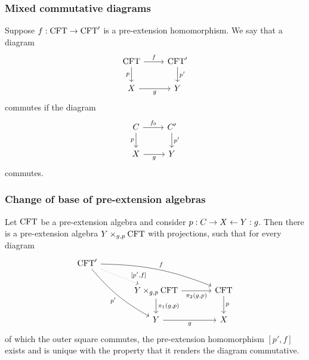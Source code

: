\documentclass{beamer}
\newcommand\important[1]{\textbf{\color{red!90!black}#1}}
\begin{document}
\begin{frame}
\frametitle{\bf Mixed commutative diagrams}
Suppose $f:\mathrm{CFT}\to\mathrm{CFT}'$ is a pre-extension homomorphism. We say that
a diagram
\begin{equation*}
\begin{tikzcd}[ampersand replacement=\&]
\stesys
  \ar{r}{f}
  \ar{d}[swap]{p}
  \&
\stesys'
  \ar{d}{p'}
  \\
X \ar{r}[swap]{g}
  \&
Y
\end{tikzcd}
\end{equation*}
commutes if the diagram
\begin{equation*}
\begin{tikzcd}[ampersand replacement=\&]
\stesysc
  \ar{r}{f_0}
  \ar{d}[swap]{p}
  \&
\stesysc'
  \ar{d}{p'}
  \\
X \ar{r}[swap]{g}
  \&
Y
\end{tikzcd}
\end{equation*}
commutes.
\end{frame}

\begin{frame}
\frametitle{\bf Change of base of pre-extension algebras}
Let $\mathrm{CFT}$ be a pre-extension algebra and consider $p:C\rightarrow X\leftarrow Y:g$.
Then there is a pre-extension algebra \important{$\cobesys{Y}{\stesys}{g}{p}$} with projections, such that for every diagram
\begin{equation*}
\begin{tikzcd}[ampersand replacement=\&,column sep=large]
\stesys'
  \ar[bend right=10]{ddr}[swap]{p'}
  \ar[bend left=10]{rrd}{f}
  \ar[dotted]{dr}[near end]{[p',f]}
  \\
  {}\&
\cobesys{Y}{\stesys}{g}{p}
  \ar{d}{\pullbackpr{1}{g}{p}}
  \ar{r}[swap]{\pullbackpr{2}{g}{p}}
  \&
\stesys
  \ar{d}{p}
  \\
  {}\&
Y \ar{r}[swap]{g}
  \&
X
\end{tikzcd}
\end{equation*}
of which the outer square commutes, the pre-extension homomorphism \important{$[p',f]$} exists
and is unique with the property that it renders the diagram commutative.
\end{frame}
\end{document}
